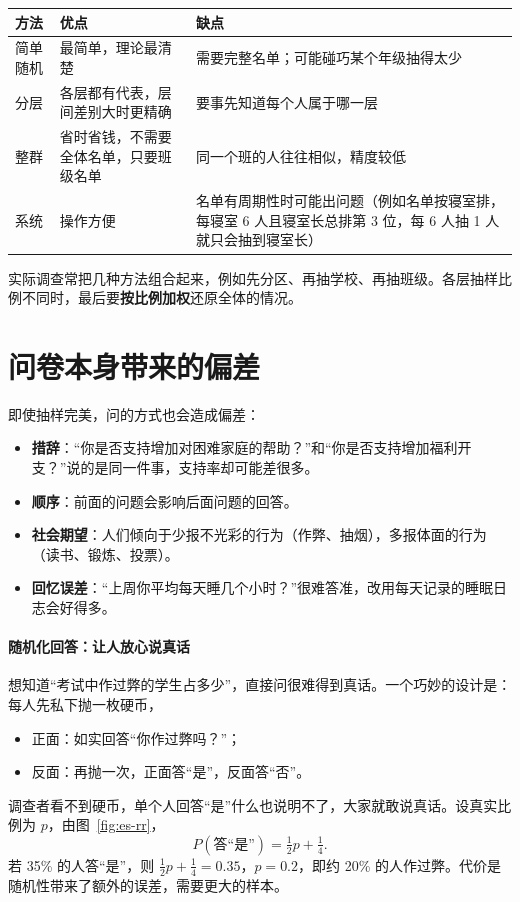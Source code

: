 \begin{center}
\small
\begin{tabular}{p{2cm}p{5.3cm}p{5.3cm}}
  \toprule
  方法 & 优点 & 缺点 \\
  \midrule
  简单随机 & 最简单，理论最清楚 & 需要完整名单；可能碰巧某个年级抽得太少 \\
  分层 & 各层都有代表，层间差别大时更精确 & 要事先知道每个人属于哪一层 \\
  整群 & 省时省钱，不需要全体名单，只要班级名单 & 同一个班的人往往相似，精度较低 \\
  系统 & 操作方便 & 名单有周期性时可能出问题（例如名单按寝室排，每寝室 6 人且寝室长总排第 3 位，每 6 人抽 1 人就只会抽到寝室长） \\
  \bottomrule
\end{tabular}
\end{center}

实际调查常把几种方法组合起来，例如先分区、再抽学校、再抽班级。各层抽样比例不同时，最后要\textbf{按比例加权}还原全体的情况。

\section{问卷本身带来的偏差}

即使抽样完美，问的方式也会造成偏差：
\begin{itemize}
  \item \textbf{措辞}：“你是否支持增加对困难家庭的帮助？”和“你是否支持增加福利开支？”说的是同一件事，支持率却可能差很多。
  \item \textbf{顺序}：前面的问题会影响后面问题的回答。
  \item \textbf{社会期望}：人们倾向于少报不光彩的行为（作弊、抽烟），多报体面的行为（读书、锻炼、投票）。
  \item \textbf{回忆误差}：“上周你平均每天睡几个小时？”很难答准，改用每天记录的睡眠日志会好得多。
\end{itemize}

\paragraph{随机化回答：让人放心说真话}
想知道“考试中作过弊的学生占多少”，直接问很难得到真话。一个巧妙的设计是：每人先私下抛一枚硬币，
\begin{itemize}
  \item 正面：如实回答“你作过弊吗？”；
  \item 反面：再抛一次，正面答“是”，反面答“否”。
\end{itemize}
调查者看不到硬币，单个人回答“是”什么也说明不了，大家就敢说真话。设真实比例为 $p$，由图~\ref{fig:es-rr}，
\[
  P(\text{答“是”})=\tfrac12p+\tfrac14 .
\]
若 35\% 的人答“是”，则 $\frac12p+\frac14=0.35$，$p=0.2$，即约 20\% 的人作过弊。代价是随机性带来了额外的误差，需要更大的样本。

